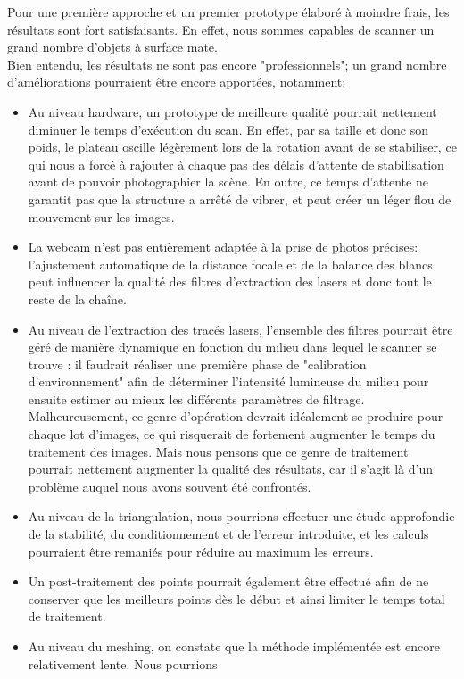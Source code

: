 \documentclass[a4paper,10pt]{report}
\begin{document}
Pour une première approche et un premier prototype élaboré à moindre frais, les résultats sont fort satisfaisants. En effet, nous sommes capables de scanner un grand nombre d'objets à surface mate.\\
Bien entendu, les résultats ne sont pas encore "professionnels"; un grand nombre d'améliorations pourraient être encore apportées, notamment:
\begin{itemize}
\item Au niveau hardware, un prototype de meilleure qualité pourrait nettement diminuer le temps d'exécution du scan. En effet, par sa taille et donc son poids, le plateau oscille légèrement lors de la rotation avant de se stabiliser, ce qui nous a forcé à rajouter à chaque pas des délais d'attente de stabilisation avant de pouvoir photographier la scène. En outre, ce temps d'attente ne garantit pas que la structure a arrêté de vibrer, et peut créer un léger flou de mouvement sur les images.
\item La webcam n'est pas entièrement adaptée à la prise de photos précises: l'ajustement automatique de la distance focale et de la balance des blancs peut influencer la qualité des filtres d'extraction des lasers et donc tout le reste de la chaîne.
\item Au niveau de l'extraction des tracés lasers, l'ensemble des filtres pourrait être géré de manière dynamique en fonction du milieu dans lequel le scanner se trouve : il faudrait réaliser une première phase de "calibration d'environnement" afin de déterminer l'intensité lumineuse du milieu pour ensuite estimer au mieux les différents paramètres de filtrage. Malheureusement, ce genre d'opération devrait idéalement se produire pour chaque lot d'images, ce qui risquerait de fortement augmenter le temps du traitement des images. Mais nous pensons que ce genre de traitement pourrait nettement augmenter la qualité des résultats, car il s'agit là d'un problème auquel nous avons souvent été confrontés.
\item Au niveau de la triangulation, nous pourrions effectuer une étude approfondie de la stabilité, du conditionnement et de l'erreur introduite, et les calculs pourraient être remaniés pour réduire au maximum les erreurs.
\item Un post-traitement des points pourrait également être effectué afin de ne conserver que les meilleurs points dès le début et ainsi limiter le temps total de traitement.
\item Au niveau du meshing, on constate que la méthode implémentée est encore relativement lente. Nous pourrions
\end{itemize}
\end{document}
